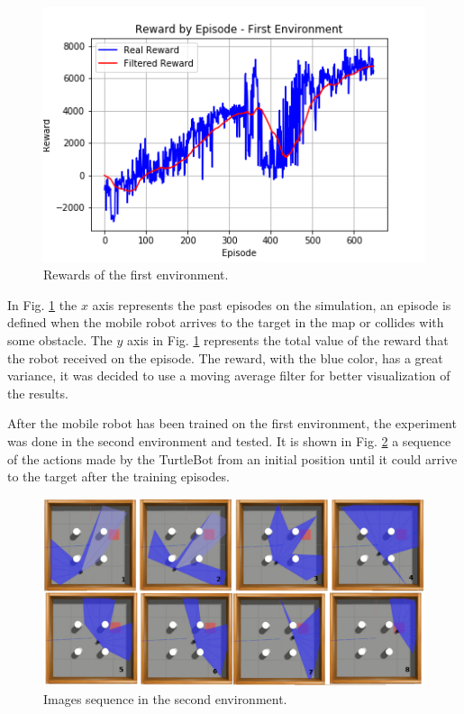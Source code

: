 \begin{figure}
\centerline{\includegraphics[width=\columnwidth]{images/stage_1.png}}
\caption{Rewards of the first environment.}
\label{fig:stage_1}
\end{figure}

In Fig. \ref{fig:stage_1} the $x$ axis represents the past episodes on the simulation, an episode is defined when the mobile robot arrives to the target in the map or collides with some obstacle. 
The $y$ axis in Fig. \ref{fig:stage_1} represents the total value of the reward that the robot received on the episode.
The reward, with the blue color, has a great variance, it was decided to use a moving average filter for better visualization of the results.

After the mobile robot has been trained on the first environment, the experiment was done in the second environment and tested. It is shown in Fig. \ref{fig:amb2target} a sequence of the actions made by the TurtleBot from an initial position until it could arrive to the target after the training episodes.

\begin{figure}
\centerline{\includegraphics[width=\columnwidth]{images/amb2target.png}}
\caption{Images sequence in the second environment.}
\label{fig:amb2target}
\end{figure}

